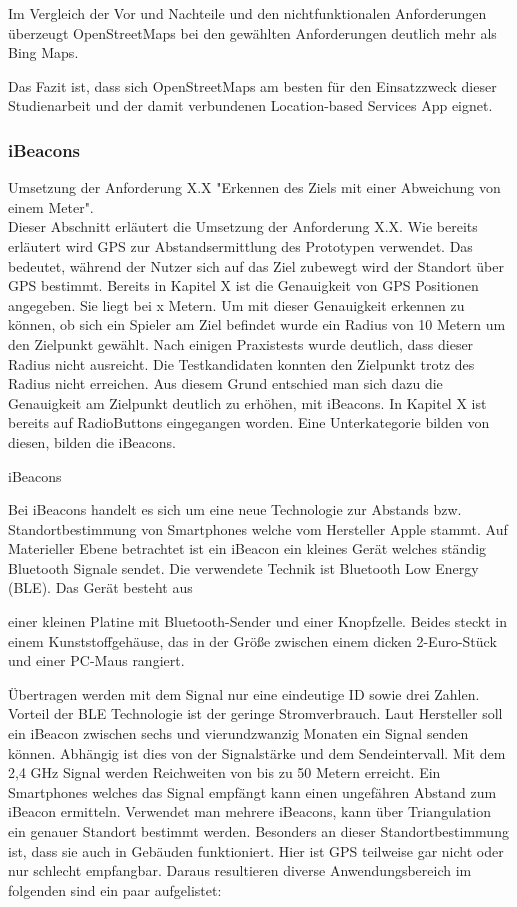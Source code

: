 Im Vergleich der Vor und Nachteile und den nichtfunktionalen Anforderungen überzeugt OpenStreetMaps bei den gewählten Anforderungen deutlich mehr als Bing Maps.

Das Fazit ist, dass sich OpenStreetMaps am besten für den Einsatzzweck dieser Studienarbeit und der damit verbundenen Location-based Services App eignet.

\subsubsection{iBeacons}
Umsetzung der Anforderung X.X "Erkennen des Ziels mit einer Abweichung von einem Meter".
\\Dieser Abschnitt erläutert die Umsetzung der Anforderung X.X. Wie bereits erläutert wird GPS zur Abstandsermittlung des Prototypen verwendet. Das bedeutet, während der Nutzer sich auf das Ziel zubewegt wird der Standort über GPS bestimmt. Bereits in Kapitel X ist die Genauigkeit von GPS Positionen angegeben.  Sie liegt bei x Metern. Um mit dieser Genauigkeit erkennen zu können, ob sich ein Spieler am Ziel befindet wurde ein Radius von 10 Metern um den Zielpunkt gewählt. Nach einigen Praxistests wurde deutlich, dass dieser Radius nicht ausreicht. Die Testkandidaten konnten den Zielpunkt trotz des Radius nicht erreichen. Aus diesem Grund entschied man sich dazu die Genauigkeit am Zielpunkt deutlich zu erhöhen, mit iBeacons. In Kapitel X ist bereits auf RadioButtons eingegangen worden. Eine Unterkategorie bilden von diesen, bilden die iBeacons.

iBeacons

Bei iBeacons handelt es sich um eine neue Technologie zur Abstands bzw. Standortbestimmung von Smartphones welche vom Hersteller Apple stammt. Auf Materieller Ebene betrachtet ist ein iBeacon ein kleines Gerät welches ständig Bluetooth Signale sendet. Die verwendete Technik ist Bluetooth Low Energy (BLE). Das Gerät besteht aus

\glqq einer kleinen Platine mit Bluetooth-Sender und einer Knopfzelle. Beides steckt in einem Kunststoffgehäuse, das in der Größe zwischen einem dicken 2-Euro-Stück und einer PC-Maus rangiert.\grqq
\cite{BeaconGolem}

Übertragen werden mit dem Signal nur eine eindeutige ID sowie drei Zahlen. Vorteil der BLE Technologie ist der geringe Stromverbrauch. Laut Hersteller soll ein iBeacon zwischen sechs und vierundzwanzig Monaten ein Signal senden können. Abhängig ist dies von der Signalstärke und dem Sendeintervall. Mit dem 2,4 GHz Signal werden Reichweiten von bis zu 50 Metern erreicht. Ein Smartphones welches das Signal empfängt kann einen ungefähren Abstand zum iBeacon ermitteln. Verwendet man mehrere iBeacons, kann über Triangulation ein genauer Standort bestimmt werden. Besonders an dieser Standortbestimmung ist, dass sie auch in Gebäuden funktioniert. Hier ist GPS teilweise gar nicht oder nur schlecht empfangbar. Daraus resultieren diverse Anwendungsbereich im folgenden sind ein paar aufgelistet:

